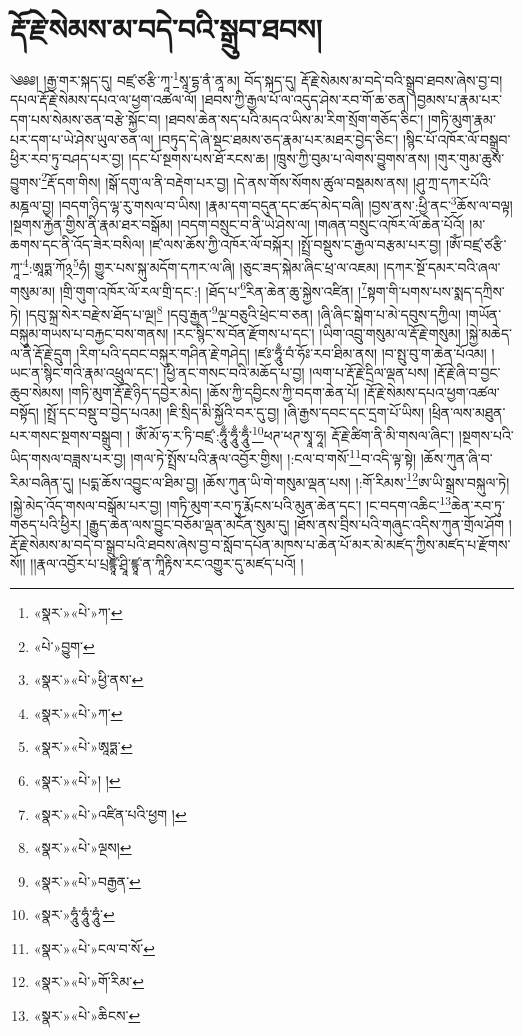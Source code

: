 \chapter{རྡོ་རྗེ་སེམས་མ་བདེ་བའི་སྒྲུབ་ཐབས།}༄༅༅། །རྒྱ་གར་སྐད་དུ། བཛྲ་ཙརྩི་ཀཱ་\footnote{«སྣར་»«པེ་»ཀ་}སཱ་དྷ་ནཾ་ནཱ་མ། བོད་སྐད་དུ། རྡོ་རྗེ་སེམས་མ་བདེ་བའི་སྒྲུབ་ཐབས་ཞེས་བྱ་བ། དཔལ་རྡོ་རྗེ་སེམས་དཔའ་ལ་ཕྱག་འཚལ་ལོ། །ཐབས་ཀྱི་རྒྱལ་པོ་ལ་འདུད་ཤེས་རབ་གོ་ཆ་ཅན། །བྱམས་པ་རྣམ་པར་དག་པས་སེམས་ཅན་བརྩེ་སྐྱོང་བ། །ཐབས་ཆེན་སད་པའི་མདའ་ཡིས་མ་རིག་སྲོག་གཅོད་ཅིང་། །གཏི་མུག་རྣམ་པར་དག་པ་ཡེ་ཤེས་ཡུལ་ཅན་ལ། །བཏུད་དེ་ཞེ་སྡང་ཐམས་ཅད་རྣམ་པར་མཐར་བྱེད་ཅིང་། །སྙིང་པོ་འཁོར་ལོ་བསྒྲུབ་ཕྱིར་རབ་ཏུ་བཤད་པར་བྱ། །དང་པོ་སྔགས་པས་ཐོ་རངས་ཆ། །ཁྲུས་ཀྱི་བུམ་པ་ལེགས་བྱུགས་ནས། །གུར་གུམ་ཆུས་བྱུགས་\footnote{«པེ་»བྱུག་}རྡོ་དག་གིས། །སྒོ་དགུ་ལ་ནི་བརྡེག་པར་བྱ། །དེ་ནས་གོས་སོགས་ཚུལ་བསྡམས་ནས། །ཤུ་ཀྲ་དཀར་པོའི་མཎྜལ་བྱ། །བདག་ཉིད་ལྷ་རུ་གསལ་བ་ཡིས། །རྣམ་དག་བདུན་དང་ཚད་མེད་བཞི། །བྱས་ནས་:ཕྱི་ནང་\footnote{«སྣར་»«པེ་»ཕྱི་ནས་}ཆོས་ལ་བལྟ། །སྔགས་རྐྱེན་གྱིས་ནི་རྣམ་ཐར་བསྒོམ། །བདག་བསྲུང་བ་ནི་ཡེ་ཤེས་ལ། །གཞན་བསྲུང་འཁོར་ལོ་ཆེན་པོའོ། །མ་ཆགས་དང་ནི་འོད་ཟེར་བསིལ། །ཛ་ལས་ཆོས་ཀྱི་འཁོར་ལོ་བསྐོར། །སྤྲོ་བསྡུས་ང་རྒྱལ་བརྩམ་པར་བྱ། །ཨོཾ་བཛྲ་ཙརྩི་ཀཱ་\footnote{«སྣར་»«པེ་»ཀ་}:ཨཱཏྨ་ཀོ྅\footnote{«སྣར་»«པེ་»ཨཱཏྨ་}ཧཾ། གྱུར་པས་སྐུ་མདོག་དཀར་ལ་ཞི། །ཅུང་ཟད་སྐེམ་ཞིང་ཕྲ་ལ་འཇམ། །དཀར་སྔོ་དམར་བའི་ཞལ་གསུམ་མ། །གྲི་གུག་འཁོར་ལོ་རལ་གྲི་དང་:། །ཐོད་པ་\footnote{«སྣར་»«པེ་»། །}རིན་ཆེན་ཆུ་སྐྱེས་འཛིན། །\footnote{«སྣར་»«པེ་»འཛིན་པའི་ཕྱག །}སྟག་གི་པགས་པས་སྨད་དཀྲིས་ཏེ། །དབུ་སྐྲ་སེར་བརྫེས་ཐོད་པ་ལྔ།\footnote{«སྣར་»«པེ་»ལྔས།} །དབུ་རྒྱན་\footnote{«སྣར་»«པེ་»བརྒྱན་}ལྔ་བཅུའི་ཕྲེང་བ་ཅན། །ཞི་ཞིང་སྒེག་པ་མེ་དབུས་དཀྱིལ། །གཡོན་བསྐུམ་གཡས་པ་བརྐྱང་བས་གནས། །རང་སྙིང་ས་བོན་རྫོགས་པ་དང་། །ཡིག་འབྲུ་གསུམ་ལ་རྡོ་རྗེ་གསུམ། །སྐྱེ་མཆེད་ལ་ནི་རྡོ་རྗེ་དྲུག །རིག་པའི་དབང་བསྐུར་གཤིན་རྗེ་གཤེད། །ཛཿ་ཧཱུྃ་བཾ་ཧོཿ་རབ་ཐིམ་ནས། །བ་སྤུ་བུ་ག་ཆེན་པོའམ། །ཡང་ན་སྙིང་གའི་རྣམ་འཕྲུལ་དང་། །ཕྱི་ནང་གསང་བའི་མཆོད་པ་བྱ། །ལག་པ་རྡོ་རྗེ་དྲིལ་ལྡན་པས། །རྡོ་རྗེ་ཞི་བ་བྱང་ཆུབ་སེམས། །གཏི་མུག་རྡོ་རྗེ་ཉིད་དབྱེར་མེད། །ཆོས་ཀྱི་དབྱིངས་ཀྱི་བདག་ཆེན་པོ། །རྡོ་རྗེ་སེམས་དཔའ་ཕྱག་འཚལ་བསྟོད། །སྤྲོ་དང་བསྡུ་བ་བྱེད་པའམ། །ཇི་སྲིད་མི་སྐྱོའི་བར་དུ་བྱ། །ཞི་རྒྱས་དབང་དང་དྲག་པོ་ཡིས། །ཕྲིན་ལས་མཐུན་པར་གསང་སྔགས་བསྒྲུབ། །
ཨོཾ་མོ་ཧ་ར་ཏི་བཛྲ་:ཧཱུྃ་ཧཱུྃ་ཧཱུྃ་\footnote{«སྣར་»ཧཱུཾ་ཧཱུཾ་ཧཱུཾ་}ཕཊ་ཕཊ་སྭཱ་ཧཱ། རྡོ་རྗེ་ཚིག་ནི་མི་གསལ་ཞིང་། །སྔགས་པའི་ཡིད་གསལ་བཟླས་པར་བྱ། །གལ་ཏེ་སྤྲོས་པའི་རྣལ་འབྱོར་གྱིས། །:ངལ་བ་གསོ་\footnote{«སྣར་»«པེ་»ངལ་བ་སོ་}བ་འདི་ལྟ་སྟེ། །ཆོས་ཀུན་ཞི་བ་རིམ་བཞིན་དུ། །པདྨ་ཆོས་འབྱུང་ལ་ཐིམ་བྱ། །ཆོས་ཀུན་ཡི་གེ་གསུམ་ལྡན་པས། །:གོ་རིམས་\footnote{«སྣར་»«པེ་»གོ་རིམ་}ཨ་ཡི་སྒྲས་བསྐུལ་ཏེ། །སྐྱེ་མེད་འོད་གསལ་བསྒོམ་པར་བྱ། །གཏི་མུག་རབ་ཏུ་རྨོངས་པའི་མུན་ཆེན་དང་། །ང་བདག་འཆིང་\footnote{«སྣར་»«པེ་»ཆིངས་}ཆེན་རབ་ཏུ་གཅད་པའི་ཕྱིར། །རྒྱུད་ཆེན་ལས་བྱུང་བཅོམ་ལྡན་མངོན་སུམ་དུ། །ཐོས་ནས་བྲིས་པའི་གཞུང་འདིས་ཀུན་གྲོལ་ཤོག །རྡོ་རྗེ་སེམས་མ་བདེ་བ་སྒྲུབ་པའི་ཐབས་ཞེས་བྱ་བ་སློབ་དཔོན་མཁས་པ་ཆེན་པོ་མར་མེ་མཛད་ཀྱིས་མཛད་པ་རྫོགས་སོ།། །།རྣལ་འབྱོར་པ་པྲཛྙཱ་ཤྲཱི་ཛྙཱ་ན་ཀཱིརྟིས་རང་འགྱུར་དུ་མཛད་པའོ། ། 